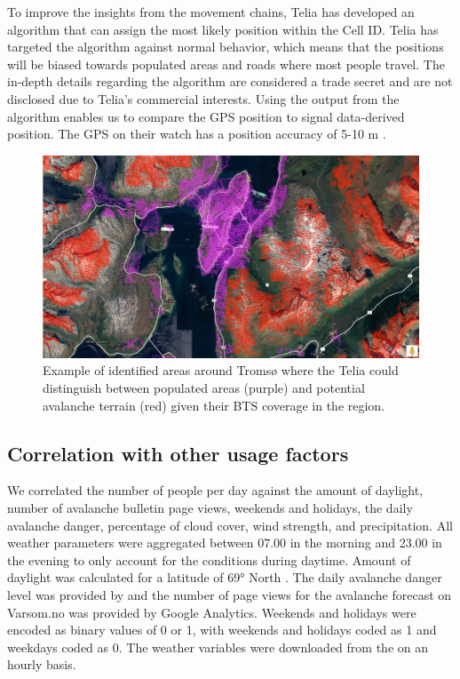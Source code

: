 \documentclass[authordate,empirical, issue]{jote-new-article}
\begin{document}
To improve the insights from the movement chains, Telia has developed an algorithm that can assign the most likely position within the Cell ID. Telia has targeted the algorithm against normal behavior, which means that the positions will be biased towards populated areas and roads where most people travel. The in-depth details regarding the algorithm are considered a trade secret and are not disclosed due to Telia's commercial interests. Using the output from the algorithm enables us to compare the GPS position to signal data-derived position. The GPS on their watch has a position accuracy of 5-10 m \parencites{Wing2005}.




\begin{figure}[t]
  \begin{fullwidth}



    \includegraphics[width=\linewidth]{media/image4.jpg}
    \caption{Example of identified areas around Tromsø where the Telia could distinguish between populated areas (purple) and potential avalanche terrain (red) given their BTS coverage in the region.}
    \label{fig:rId11}

  \end{fullwidth}
\end{figure}


\subsection{Correlation with other usage factors }



We correlated the number of people per day against the amount of daylight, number of avalanche bulletin page views, weekends and holidays, the daily avalanche danger, percentage of cloud cover, wind strength, and precipitation. All weather parameters were aggregated between 07.00 in the morning and 23.00 in the evening to only account for the conditions during daytime. Amount of daylight was calculated for a latitude of 69° North \parencites{SatAgro2019}. The daily avalanche danger level was provided by \textcite{Varsom2021} and the number of page views for the avalanche forecast on Varsom.no was provided by Google Analytics. Weekends and holidays were encoded as binary values of 0 or 1, with weekends and holidays coded as 1 and weekdays coded as 0. The weather variables were downloaded from the \textcites{NorwegianCentreforClimateServices2021} on an hourly basis.
\end{document}
